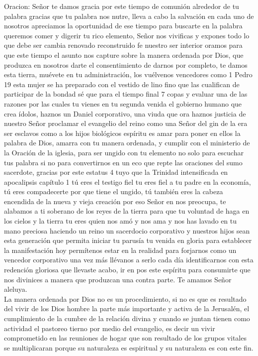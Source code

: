 \documentclass[12pt]{article}
\begin{document}
Oracion: Señor te damos gracia por este tiempo de comunión alrededor de tu palabra gracias que tu palabra nos nutre, lleva a cabo la salvación en cada uno de nosotros apreciamos la oportunidad de ese tiempo para buscarte en la palabra queremos comer y digerir tu rico elemento, Señor nos vivificas y expones todo lo que debe ser cambia renovado reconstruido fe nuestro ser interior oramos para que este tiempo el asunto nos capture sobre la manera ordenada por Dios, que produzca en nosotros darte el consentimiento de darnos por completo, te damos esta tierra, muévete en tu administración, los vuélvenos vencedores como 1 Pedro 19 esta mujer se ha preparado con el vestido de lino fino que las cualifican de participar de la bondad sé que para el tiempo final 7 copas y evaluar una de las razones por las cuales tu vienes en tu segunda venida el gobierno humano que crea ídolos, haznos un Daniel corporativo, una viuda que ora haznos justicia de nuestro Señor proclamar el evangelio del reino como una Señor del gin de la era ser esclavos como a los hijos biológicos espíritu es amar para poner en ellos la palabra de Dios, amarra con tu manera ordenada, y cumplir con el ministerio de la Oración de la iglesia, para ser ungido con tu elemento no solo para escuchar tus palabra si no para convertirnos en un eco que repte las oraciones del sumo sacerdote, gracias por este estatus 4 tuyo que la Trinidad intensificada en apocalipsis capítulo 1 tú eres el testigo fiel tu eres fiel a tu padre en la economía, tú eres compadecerte por que tiene el ungido, tú también eres la cabeza encendida de la nueva y vieja creación por eso Señor en nos preocupa, te alabamos a ti soberano de los reyes de la tierra para que tu voluntad de haga en los cielos y la tierra tu eres quien nos amó y nos ama y nos has lavado en tu mano preciosa haciendo un reino un sacerdocio corporativo y nuestros hijos sean esta generación que permita iniciar tu parusía tu venida en gloria para establecer la manifestación hoy permítenos estar en la realidad para forjarnos como un vencedor corporativo una vez más llévanos a serlo cada día identificarnos con esta redención gloriosa que llevaste acabo, ir en pos este espíritu para consumirte que nos divinices a manera que produzcan una contra parte. Te amamos Señor aleluya.\\

La manera ordenada por Dios no es un procedimiento, si no es que es resultado del vivir de los Dios hombre la parte más importante y activa de la Jerusalén, el cumplimiento de la cumbre de la relación divina y cuando se juntan tienen como actividad el pastoreo tierno por medio del evangelio, es decir un vivir comprometido en las reuniones de hogar que son resultado de los grupos vitales se multiplicaran porque su naturaleza es espiritual y su naturaleza es con este fin.\\
\end{document}
